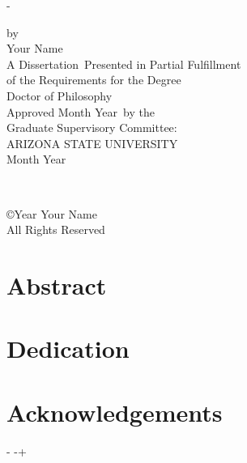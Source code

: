 \documentclass[letterpaper,             %
               oneside,                 %
               \pointsize]              %
               {memoir}
\newcommand*\Author{Your Name}                      %
\newcommand*{\documentname}%
  {Dissertation}                        %
\newcommand*{\degreename}
  {Doctor of Philosophy}                %
\newcommand*\defdate{Month Year}                       %
\newcommand*{\chairlabel}{Chair}        %
\newcommand*{\gradmonth}{Month}         %
\newcommand*{\gradyear}{Year}           %
\newcommand*{\graddate}{\gradmonth%
  \space\gradyear}
\newlength{\savedfootskip}
\newcommand{\titlepagesetup}{%
  \changepage%
    {\savedfootskip}%
    {}%
    {}%
    {}%
    {}%
    {}%
    {}%
    {}%
    {-\savedfootskip}%
}
\newcommand{\closetitlepagesetup}{%
  \changepage{-\savedfootskip}{}{}{}{}%
    {}{}{}{\savedfootskip}%
}
\newcommand*{\titlepageASU}{
  \titlepagesetup
  \clearpage
  \begin{center}
  \SingleSpacing
  \thispagestyle{empty}
    \renewcommand*{\do}[1]{##1 \\[\baselineskip]} 
    \dolistloop{\titlelines}
    by \\[\baselineskip]
    \Author \\[4\baselineskip]
    A \documentname~Presented in Partial Fulfillment \\
    of the Requirements for the Degree \\
    \degreename \\
    \vfill                              %
    Approved \defdate~by the \\
    Graduate Supervisory Committee: \\[\baselineskip]
    \renewcommand*{\do}[1]{##1, \chairlabel \\} 
    \dolistloop{\committeechair} 
    \renewcommand*{\do}[1]{##1 \\} 
    \dolistloop{\committeemember}
    \vfill                              %
    ARIZONA STATE UNIVERSITY \\[\baselineskip]
    \graddate
  \end{center}
  \clearpage
  \closetitlepagesetup
}
\newlength{\verticalpush}               %
\newcommand{\contentslistsetup}{%
  \changepage%
    {-\baselineskip}%
    {}%
    {}%
    {}%
    {}%
    {\verticalpush}%
    {}%
    {}%
    {-\verticalpush+\baselineskip}%
}
\renewcommand*{\do}[1]{#1\ }%
\renewcommand*{\do}[1]{{#1}\ }%
\newcommand{\copyrightpageASU}{%
  \thispagestyle{empty}
  ~\\ \vfill
  \parbox{\textwidth}{%
    \begin{center}
      \copyright\gradyear\space%
      \Author\\%
      All Rights Reserved%
    \end{center}%
  }%
  \clearpage%
}
\begin{document}
\titlepageASU

\copyrightpageASU                       %

\pagestyle{ASU}
\frontmatter

\chapter*{Abstract}                     %

\chapter*{Dedication}                   %

\chapter*{Acknowledgements}             %

\iftoggle{usemicrotype}                 %
  {\microtypesetup{protrusion=false}}%
  {}
\clearpage                              %
\contentslistsetup                      %
\end{document}
